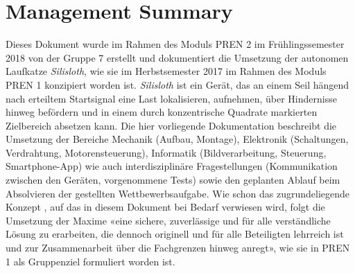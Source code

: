 \section*{Management Summary}

Dieses Dokument wurde im Rahmen des Moduls PREN 2 im Frühlingssemester 2018 von der Gruppe 7 erstellt und dokumentiert die Umsetzung der autonomen Laufkatze \textit{Silisloth}, wie sie im Herbstsemester 2017 im Rahmen des Moduls PREN 1 konzipiert worden ist. \textit{Silisloth} ist ein Gerät, das an einem Seil hängend nach erteiltem Startsignal eine Last lokalisieren, aufnehmen, über Hindernisse hinweg befördern und in einem durch konzentrische Quadrate markierten Zielbereich absetzen kann. Die hier vorliegende Dokumentation beschreibt die Umsetzung der Bereiche Mechanik (Aufbau, Montage), Elektronik (Schaltungen, Verdrahtung, Motorensteuerung), Informatik (Bildverarbeitung, Steuerung, Smartphone-App) wie auch interdisziplinäre Fragestellungen (Kommunikation zwischen den Geräten, vorgenommene Tests) sowie den geplanten Ablauf beim Absolvieren der gestellten Wettbewerbsaufgabe. Wie schon das zugrundeliegende Konzept \cite{pren1}, auf das in diesem Dokument bei Bedarf verwiesen wird, folgt die Umsetzung der Maxime «eine sichere, zuverlässige und für alle verständliche Lösung zu erarbeiten, die dennoch originell und für alle Beteiligten lehrreich ist und zur Zusammenarbeit über die Fachgrenzen hinweg anregt», wie sie in PREN 1 als Gruppenziel formuliert worden ist.
